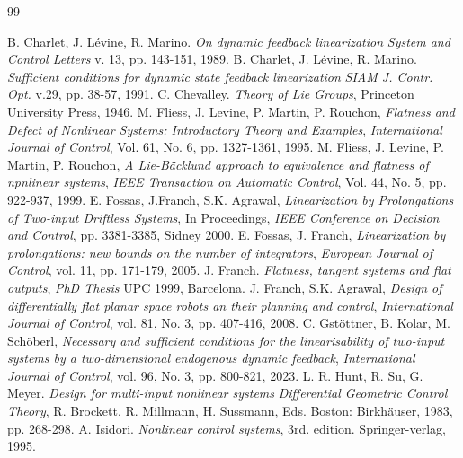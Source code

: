 \documentclass[10pt]{article}
\newcommand{\3}{\mathbf{3}}
\newcommand{\2}{\mathbf{2}}
\newcommand{\1}{\mathbf{1}}
\newcommand{\0}{\mathbf{0}}
\begin{document}
\begin{thebibliography}{99}


 B. Charlet, J. L\'evine, R. Marino. \emph{On dynamic feedback linearization} {\em System and Control Letters} v. 13, pp. 143-151, 1989.
 B. Charlet, J. L\'evine, R. Marino. \emph{Sufficient conditions for dynamic state feedback linearization} {\em SIAM J. Contr. Opt. } v.29, pp. 38-57, 1991.
 C. Chevalley. \emph{Theory of Lie Groups}, Princeton University Press, 1946.
 M. Fliess, J. Levine, P. Martin, P. Rouchon, \emph{Flatness and Defect of Nonlinear Systems:  Introductory Theory and Examples}, {\em  International Journal of Control}, Vol. 61, No.  6, pp. 1327-1361, 1995.
 M. Fliess, J. Levine, P. Martin, P. Rouchon, \emph{A Lie-B\"acklund approach to equivalence and flatness of npnlinear systems}, {\em  IEEE Transaction on Automatic Control}, Vol. 44, No.  5, pp. 922-937, 1999.
 E. Fossas, J.Franch, S.K. Agrawal, \emph{Linearization by Prolongations of Two-input Driftless Systems}, In Proceedings, {\em IEEE Conference on Decision and Control}, pp. 3381-3385, Sidney 2000.
 E. Fossas, J. Franch, \emph{Linearization by prolongations: new bounds on the number of integrators}, {\em European Journal of Control}, vol. 11, pp. 171-179, 2005.
 J. Franch. \emph{Flatness, tangent systems and flat outputs}, {\em PhD Thesis} UPC 1999, Barcelona.
 J. Franch, S.K. Agrawal, \emph{Design of differentially flat planar space robots an their planning and control}, {\em International Journal of Control}, vol. 81, No. 3, pp. 407-416, 2008.
 C. Gstöttner, B.  Kolar, M. Schöberl,  \emph{Necessary and sufficient conditions for the linearisability of two-input systems by a two-dimensional endogenous dynamic feedback}, {\em International Journal of Control}, vol. 96, No. 3, pp. 800-821, 2023.
 L. R. Hunt, R. Su, G. Meyer. \emph{Design for multi-input nonlinear systems} {\em Differential Geometric Control Theory}, R. Brockett, R. Millmann, H. Sussmann, Eds. Boston: Birkh\"auser, 1983, pp. 268-298.
 A. Isidori. \emph{Nonlinear control systems}, 3rd. edition. Springer-verlag, 1995.

\end{thebibliography}
\end{document}

